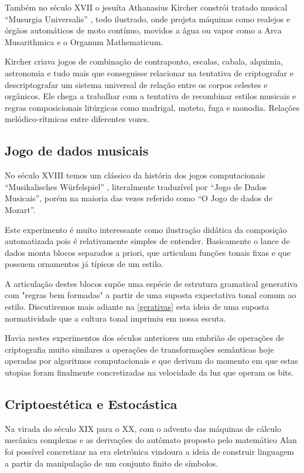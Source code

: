 \documentclass[
	12pt,				%
	openright,			%
	twoside,			%
	a4paper,			%
	english,			%
	french,				%
	spanish,			%
	brazil				%
	]{abntex2}
\begin{document}
Também no século XVII o jesuíta Athanasius Kircher constrói tratado musical “Musurgia Universalis” \cite{kircher1650}, todo ilustrado, onde projeta máquinas como realejos e órgãos automáticos de moto contínuo, movidos a água ou vapor como a Arca Musarithmica e o Organum Mathematicum. 

Kircher criava jogos de combinação de contraponto, escalas, cabala, alquimia, astronomia e tudo mais que conseguisse relacionar na tentativa de criptografar e descriptografar um sistema universal de relação entre os corpos celestes e orgânicos. Ele chega a trabalhar com a tentativa de recombinar estilos musicais e regras composicionais litúrgicas como madrigal, moteto, fuga e monodia. Relações melódico-rítmicas entre diferentes vozes.\cite{godwin1979athanasius}

\subsection{Jogo de dados musicais}

No século XVIII temos um clássico da história dos jogos computacionais  “Musikalisches Würfelspiel” , literalmente traduzível por “Jogo de Dados Musicais”, porém na maioria das vezes referido como “O Jogo de dados de Mozart”. 

Este experimento é muito interessante como ilustração didática da composição automatizada pois é relativamente simples de entender. Basicamente o lance de dados monta blocos separados a priori, que articulam funções tonais fixas e que possuem ornamentos já típicos de um estilo.
 
A articulação destes blocos supõe uma espécie de estrutura gramatical generativa com "regras bem formadas" a partir de uma suposta expectativa tonal comum ao estilo. Discutiremos mais adiante na \autoref{gerativas} esta ideia de uma suposta normatividade que a cultura tonal imprimiu em nossa escuta.

Havia nestes experimentos dos séculos anteriores um embrião de operações de criptografia muito similares a operações de transformações semânticas hoje operadas por algoritmos computacionais e que derivam do momento em que estas utopias foram finalmente concretizadas na velocidade da luz que operam os bits. 


\subsection{Criptoestética e Estocástica}

Na virada do século XIX para o XX, com o advento das máquinas de cálculo mecânica complexas e as derivações do autômato proposto pelo matemático Alan  foi possível concretizar na era eletrônica vindoura a ideia de construir linguagem a partir da manipulação de um conjunto finito de símbolos.
\end{document}
